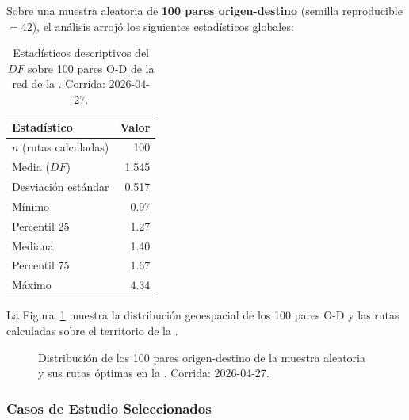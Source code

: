 Sobre una muestra aleatoria de \textbf{100 pares origen-destino} (semilla
reproducible $= 42$), el análisis arrojó los siguientes estadísticos globales:

\begin{table}[H]
    \centering
    \caption[Estadísticos globales del Factor de Desviación — muestra de 100 rutas]{
    Estadísticos descriptivos del $DF$ sobre 100 pares O-D de la red de la \zmvm.
    Corrida: 2026-04-27.}
    \label{tab:df-estadisticas}
    \begin{tabular}{|l|r|}
        \hline
        \textbf{Estadístico} & \textbf{Valor} \\
        \hline
        $n$ (rutas calculadas)     & 100   \\
        Media ($\bar{DF}$)         & 1.545 \\
        Desviación estándar        & 0.517 \\
        Mínimo                     & 0.97  \\
        Percentil 25               & 1.27  \\
        Mediana                    & 1.40  \\
        Percentil 75               & 1.67  \\
        Máximo                     & 4.34  \\
        \hline
    \end{tabular}
\end{table}

La Figura~\ref{fig:df-caso-inicial} muestra la distribución geoespacial de los
100 pares O-D y las rutas calculadas sobre el territorio de la \zmvm{}.

\begin{figure}[H]
    \centering
    \caption[Distribución de la muestra O-D para el Factor de Desviación]{
    Distribución de los 100 pares origen-destino de la muestra aleatoria y sus
    rutas óptimas en la \zmvm. Corrida: 2026-04-27.}
    \label{fig:df-caso-inicial}
\end{figure}

\subsubsection{Casos de Estudio Seleccionados}
\label{subsubsec:df-casos}

